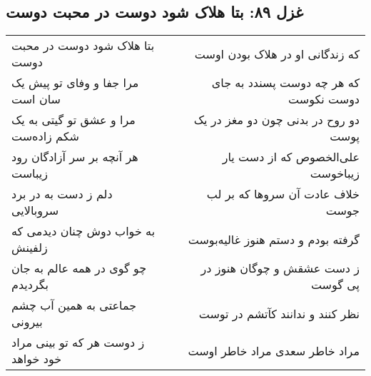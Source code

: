 \begin{center}
\section*{غزل ۸۹: بتا هلاک شود دوست در محبت دوست}
\label{sec:089}
\begin{longtable}{l p{0.5cm} r}
بتا هلاک شود دوست در محبت دوست
&&
که زندگانی او در هلاک بودن اوست
\\
مرا جفا و وفای تو پیش یک سان است
&&
که هر چه دوست پسندد به جای دوست نکوست
\\
مرا و عشق تو گیتی به یک شکم زاده‌ست
&&
دو روح در بدنی چون دو مغز در یک پوست
\\
هر آنچه بر سر آزادگان رود زیباست
&&
علی‌الخصوص که از دست یار زیباخوست
\\
دلم ز دست به در برد سروبالایی
&&
خلاف عادت آن سروها که بر لب جوست
\\
به خواب دوش چنان دیدمی که زلفینش
&&
گرفته بودم و دستم هنوز غالیه‌بوست
\\
چو گوی در همه عالم به جان بگردیدم
&&
ز دست عشقش و چوگان هنوز در پی گوست
\\
جماعتی به همین آب چشم بیرونی
&&
نظر کنند و ندانند کآتشم در توست
\\
ز دوست هر که تو بینی مراد خود خواهد
&&
مراد خاطر سعدی مراد خاطر اوست
\\
\end{longtable}
\end{center}

